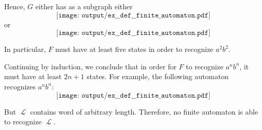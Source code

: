 \begin{example}
\begin{thmenum}
    Hence, \( G \) either has as a subgraph either
    \begin{equation*}
      \texttt{[image: output/ex\_\_def\_\_finite\_automaton.pdf]}
    \end{equation*}
    or
    \begin{equation*}
      \texttt{[image: output/ex\_\_def\_\_finite\_automaton.pdf]}
    \end{equation*}

    In particular, \( F \) must have at least five states in order to recognize \( a^2 b^2 \).

    Continuing by induction, we conclude that in order for \( F \) to recognize \( a^n b^n \), it must have at least \( 2n + 1 \) states. For example, the following automaton recognizes \( a^n b^n \):
    \begin{equation*}
      \texttt{[image: output/ex\_\_def\_\_finite\_automaton.pdf]}
    \end{equation*}

    But \( \mscrL \) contains word of arbitrary length. Therefore, no finite automaton is able to recognize \( \mscrL \).
  \end{thmenum}
\end{example}

